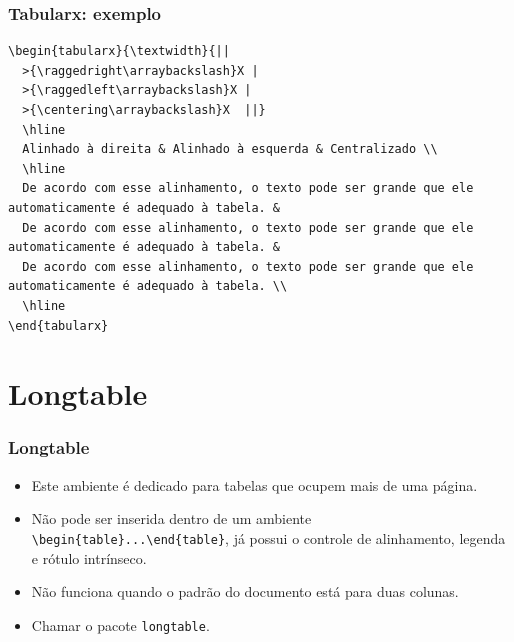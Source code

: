 \documentclass[brazilian]{beamer}
\begin{document}
\begin{frame}[fragile]
  \frametitle{Tabularx: exemplo}
  \footnotesize
  \begin{lstlisting}[style=myStyleLatex]
\begin{tabularx}{\textwidth}{|| 
  >{\raggedright\arraybackslash}X | 
  >{\raggedleft\arraybackslash}X | 
  >{\centering\arraybackslash}X  ||}
  \hline
  Alinhado à direita & Alinhado à esquerda & Centralizado \\
  \hline
  De acordo com esse alinhamento, o texto pode ser grande que ele automaticamente é adequado à tabela. & 
  De acordo com esse alinhamento, o texto pode ser grande que ele automaticamente é adequado à tabela. & 
  De acordo com esse alinhamento, o texto pode ser grande que ele automaticamente é adequado à tabela. \\
  \hline
\end{tabularx}
\end{lstlisting}

\end{frame}

\section{Longtable}
\begin{frame}[fragile]
  \frametitle{Longtable}

  \begin{itemize}
    \item Este ambiente é dedicado para tabelas que ocupem mais de uma página.
    \item Não pode ser inserida dentro de um ambiente \lstinline[style=myStyleLatex]!\begin{table}...\end{table}!, já possui o controle de alinhamento, legenda e rótulo intrínseco.
    \item Não funciona quando o padrão do documento está para duas colunas.
    \item Chamar o pacote \lstinline[style=myStyleLatex]!longtable!.
  \end{itemize}
\end{frame}
\end{document}
